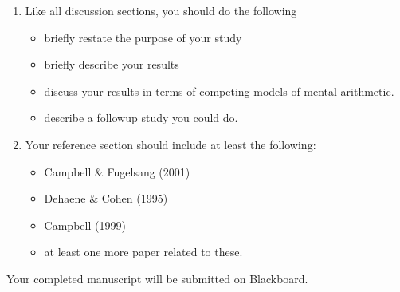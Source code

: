 \documentclass[11pt]{article}
\begin{document}
\begin{enumerate}
\item Like all discussion sections, you should do the following
\begin{itemize}
\item briefly restate the purpose of your study
\item briefly describe your results
\item discuss your results in terms of competing models of mental arithmetic.
\item describe a followup study you could do.
\end{itemize}

\item Your reference section should include at least the following:
\begin{itemize}
\item Campbell \& Fugelsang (2001)
\item Dehaene \& Cohen (1995)
\item Campbell (1999)
\item at least one more paper related to these.
\end{itemize}
\end{enumerate}

Your completed manuscript will be submitted on Blackboard.
\end{document}
